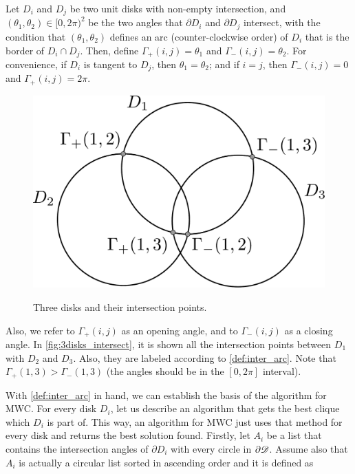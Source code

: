 \begin{definicao}\label{def:inter_arc}
    Let $D_i$ and $D_j$ be two unit disks with non-empty intersection, and $(\theta_1, \theta_2) \in [0,2\pi)^2$ be the two angles that $\partial D_i$ and $\partial D_j$ intersect, with the condition that $(\theta_1,\theta_2)$ defines an arc (counter-clockwise order) of $D_i$ that is the border of $D_i \cap D_j$. Then, define $\Gamma_+(i,j) = \theta_1$ and $\Gamma_-(i,j) = \theta_2$. For convenience, if $D_i$ is tangent to $D_j$, then $\theta_1=\theta_2$; and if $i=j$, then $\Gamma_-(i, j)=0$ and $\Gamma_+(i,j)=2\pi$.
\end{definicao}

\begin{figure}
\centering

    \caption{Three disks and their intersection points.}
    \includegraphics[scale=.36]{tex/figures/3_disks_intersect.pdf}
%    
    \fautor
    \label{fig:3disks_intersect}
\end{figure}

Also, we refer to $\Gamma_+(i,j)$ as an opening angle, and to $\Gamma_-(i,j)$ as a closing angle. In \autoref{fig:3disks_intersect}, it is shown all the intersection points between $D_1$ with $D_2$ and $D_3$. Also, they are labeled according to \autoref{def:inter_arc}. Note that $\Gamma_+(1,3) > \Gamma_-(1,3)$ (the angles should be in the $[0,2\pi]$ interval).

With \autoref{def:inter_arc} in hand, we can establish the basis of the algorithm for MWC. For every disk $D_i$, let us describe an algorithm that gets the best clique which $D_i$ is part of. This way, an algorithm for MWC just uses that method for every disk and returns the best solution found. Firstly, let $A_i$ be a list that contains the intersection angles of $\partial D_i$ with every circle in $\partial \mathscr{D}$. Assume also that $A_i$ is actually a circular list sorted in ascending order and it is defined as

